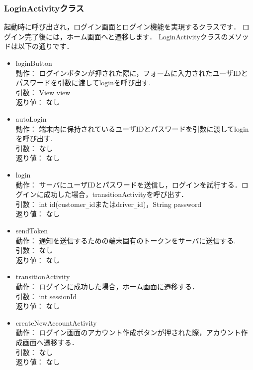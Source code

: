 \documentclass[a4j,titlepage]{jarticle}
\begin{document}
\subsubsection{LoginActivityクラス}
起動時に呼び出され，ログイン画面とログイン機能を実現するクラスです．
ログイン完了後には，ホーム画面へと遷移します．
LoginActivityクラスのメソッドは以下の通りです．
\begin{itemize}
\item loginButton\\
  動作： ログインボタンが押された際に，フォームに入力されたユーザIDとパスワードを引数に渡してloginを呼び出す.\\
  引数： View view\\
  返り値： なし
  
  \item autoLogin\\
  動作： 端末内に保持されているユーザIDとパスワードを引数に渡してloginを呼び出す.\\
  引数： なし\\
  返り値： なし

\item login\\
  動作： サーバにユーザIDとパスワードを送信し，ログインを試行する．ログインに成功した場合，transitionActivityを呼び出す．\\
  引数： int id(customer\verb|_|idまたはdriver\verb|_|id)，String password\\
  返り値： なし

 \item sendToken\\
  動作： 通知を送信するための端末固有のトークンをサーバに送信する.\\
  引数： なし\\
  返り値： なし

\item transitionActivity\\
  動作： ログインに成功した場合，ホーム画面に遷移する．\\
  引数： int sessionId\\
  返り値： なし

  \item createNewAccountActivity\\
  動作： ログイン画面のアカウント作成ボタンが押された際，アカウント作成画面へ遷移する．\\
  引数： なし\\
  返り値： なし
\end{itemize}
\end{document}
